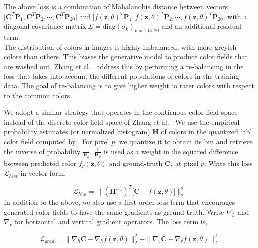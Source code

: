 \documentclass[10pt,twocolumn,letterpaper]{article}
\begin{document}
The above loss is a combination of Mahalanobis distance \cite{mah30} between vectors
$\lbrack \mathbf{C}^{T}\mathbf{P}_1, \mathbf{C}^{T}\mathbf{P}_2, \cdots, \mathbf{C}^{T}\mathbf{P}_{20} \rbrack$
and $\lbrack f(\mathbf{z}, \theta)^{T}\mathbf{P}_1, f(\mathbf{z}, \theta)^{T}\mathbf{P}_2, \cdots, f(\mathbf{z}, \theta)^{T}\mathbf{P}_{20} \rbrack$ with a diagonal covariance matrix $\Sigma = \text{diag}(\sigma_{k})_{k=1 \text{ to } 20}$ and an additional residual term. \\

 The distribution of colors in images is highly imbalanced, with more 
greyish colors than others. This biases the generative model to produce color fields that
are washed out. Zhang et al.~\cite{ZhangColorful} address this by performing a re-balancing in the loss that 
takes into account the different populations of colors in the training data.
The goal of re-balancing is to give higher weight to rarer colors with respect
to the common colors. 

We adopt a similar strategy that operates in the continuous color field space instead of 
the discrete color field space of Zhang et al. \cite{ZhangColorful}. We use the  
empirical probability estimates (or normalized histogram) $\mathbf{H}$ of colors in the 
quantized `ab' color field computed by \cite{ZhangColorful}. For pixel $p$, we quantize it 
to obtain its bin and retrieve the inverse of probability $\frac{1}{\mathbf{H}_p}$. $\frac{1}{\mathbf{H}_p}$ 
is used as a weight in the squared difference between predicted color $f_{p}(\mathbf{z}, \theta)$ and 
ground-truth $\mathbf{C}_p$ at pixel $p$. Write this loss $\mathcal{L}_{hist}$ in vector form, 

\begin{equation}
\label{eq:vae_loss_hist}
\mathcal{L}_{hist} = \| ({\mathbf{H}^{-1}})^{T} \lbrack \mathbf{C} - f(\mathbf{z}, \theta) \rbrack \|^{2}_{2}
\end{equation} In addition to the above, we also use a first order loss term that encourages generated 
color fields to have the same gradients as ground truth. Write $\nabla_{h}$ and $\nabla_{v}$
for horizontal and vertical gradient operators. The loss term is,

\begin{equation}
\label{eq:vae_loss_grad}
\mathcal{L}_{grad} = \| \nabla_{h} \mathbf{C} - \nabla_{h} f(\mathbf{z}, \theta) \|^{2}_{2} + \| \nabla_{v} \mathbf{C} - \nabla_{v} f(\mathbf{z}, \theta) \|^{2}_{2}
\end{equation}
\end{document}
